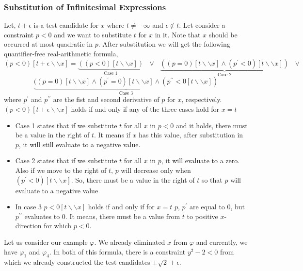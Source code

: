 \subsubsection{Substitution of Infinitesimal Expressions}
Let, $t+\epsilon$ is a test candidate for $x$ where $t\neq - \infty$ and $\epsilon \notin t$. Let consider a constraint $p<0$ and we want to substitute $t$ for $x$ in it. Note that $x$ should be occurred at most quadratic in $p$. After substitution we will get the following quantifier-free real-arithmetic formula,
$$(p<0)[t+\epsilon\backslash\backslash x]=\underbrace{((p<0)[t\backslash\backslash x])}\limits_{\text{Case 1}} \text{ }\vee\text{ }\underbrace{((p=0)[t\backslash\backslash x]\wedge(p^{\prime}<0)[t\backslash\backslash x])}\limits_{\text{Case 2}}\text{ }\vee$$
$$\underbrace{((p=0)[t\backslash\backslash x]\wedge(p^{\prime}=0)[t\backslash\backslash x]\wedge (p^{\prime\prime}<0[t\backslash\backslash x])}\limits_{\text{Case 3}} $$
where $p^{\prime}$ and $p^{\prime\prime}$ are the fist and second derivative of $p$ for $x$, respectively. $(p<0)[t+\epsilon\backslash\backslash x]$ holds if and only if any of the three cases hold for $x=t$
\begin{itemize}
	\item Case 1 states that if we substitute $t$ for all $x$ in $p<0$ and it holds, there must be a value in the right of $t$. It means if $x$ has this value, after substitution in $p$, it will still evaluate to a negative value.
	\item Case 2 states that if we substitute $t$ for all $x$ in $p$, it will evaluate to a zero. Also if we move to the right of $t$, $p$ will decrease only when $(p^{\prime}<0)[t\backslash\backslash x]$. So, there must be a value in the right of $t$ so that $p$ will evaluate to a negative value
	\item In case 3 $p<0[t\backslash\backslash x]$ holds if and only if for $x = t$ $p$, $p^{\prime}$ are equal to $0$, but $p^{\prime\prime}$ evaluates to $0$. It means, there must be a value from $t$ to positive $x$-direction for which $p<0$.
\end{itemize}

	Let us consider our example $\varphi$. We already eliminated $x$ from $\varphi$ and currently, we have $\varphi_{1}$ and $\varphi_{4}$. In both of this formula, there is a constraint $y^{2}-2<0$ from which we already constructed the test candidates $\pm\sqrt{2}+\epsilon$.

